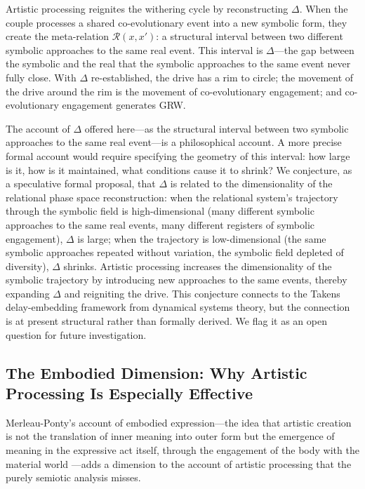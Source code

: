 Artistic processing reignites the withering cycle by reconstructing $\Delta$. When the couple processes a shared co-evolutionary event into a new symbolic form, they create the meta-relation $\mathcal{R}(x, x')$: a structural interval between two different symbolic approaches to the same real event. This interval is $\Delta$---the gap between the symbolic and the real that the symbolic approaches to the same event never fully close. With $\Delta$ re-established, the drive has a rim to circle; the movement of the drive around the rim is the movement of co-evolutionary engagement; and co-evolutionary engagement generates GRW.

\begin{openquestion}
The account of $\Delta$ offered here---as the structural interval between two symbolic approaches to the same real event---is a philosophical account. A more precise formal account would require specifying the geometry of this interval: how large is it, how is it maintained, what conditions cause it to shrink? We conjecture, as a speculative formal proposal, that $\Delta$ is related to the dimensionality of the relational phase space reconstruction: when the relational system's trajectory through the symbolic field is high-dimensional (many different symbolic approaches to the same real events, many different registers of symbolic engagement), $\Delta$ is large; when the trajectory is low-dimensional (the same symbolic approaches repeated without variation, the symbolic field depleted of diversity), $\Delta$ shrinks. Artistic processing increases the dimensionality of the symbolic trajectory by introducing new approaches to the same events, thereby expanding $\Delta$ and reigniting the drive. This conjecture connects to the Takens delay-embedding framework from dynamical systems theory, but the connection is at present structural rather than formally derived. We flag it as an open question for future investigation.
\end{openquestion}

\subsection{The Embodied Dimension: Why Artistic Processing Is Especially Effective}
\label{p15:subsec:embodied}

\noindent
Merleau-Ponty's account of embodied expression---the idea that artistic creation is not the translation of inner meaning into outer form but the emergence of meaning in the expressive act itself, through the engagement of the body with the material world \parencite{merleau-ponty1962}---adds a dimension to the account of artistic processing that the purely semiotic analysis misses.

